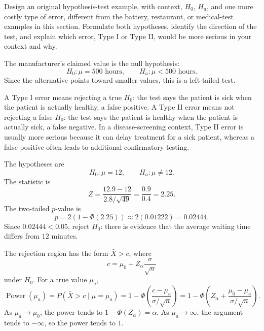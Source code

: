 \begin{problema}\label{prob:d04b6da}
Design an original hypothesis-test example, with context, $H_0$, $H_a$, and one more costly type of error, different from the battery, restaurant, or medical-test examples in this section. Formulate both hypotheses, identify the direction of the test, and explain which error, Type I or Type II, would be more serious in your context and why.
\end{problema}

\begin{solproblema}
The manufacturer's claimed value is the null hypothesis:
\[
	H_0:\mu=500\text{ hours},\qquad H_a:\mu<500\text{ hours}.
\]
Since the alternative points toward smaller values, this is a left-tailed test.
\end{solproblema}

\begin{solproblema}[prob:78013c6]
A Type I error means rejecting a true $H_0$: the test says the patient is sick when the patient is actually healthy, a false positive. A Type II error means not rejecting a false $H_0$: the test says the patient is healthy when the patient is actually sick, a false negative. In a disease-screening context, Type II error is usually more serious because it can delay treatment for a sick patient, whereas a false positive often leads to additional confirmatory testing.
\end{solproblema}

\begin{solproblema}[prob:74dc84f]
The hypotheses are
\[
	H_0:\mu=12,\qquad H_a:\mu\ne12.
\]
The statistic is
\[
	Z=\frac{12.9-12}{2.8/\sqrt{49}}=\frac{0.9}{0.4}=2.25.
\]
The two-tailed $p$-value is
\[
	p=2(1-\Phi(2.25))\approx2(0.01222)=0.02444.
\]
Since $0.02444<0.05$, reject $H_0$: there is evidence that the average waiting time differs from $12$ minutes.
\end{solproblema}

\begin{solproblema}
The rejection region has the form $\bar X>c$, where
\[
	c=\mu_0+Z_\alpha\frac{\sigma}{\sqrt n}
\]
under $H_0$. For a true value $\mu_a$,
\[
	\operatorname{Power}(\mu_a)
	=P(\bar X>c\mid\mu=\mu_a)
	=1-\Phi\left(\frac{c-\mu_a}{\sigma/\sqrt n}\right)
	=1-\Phi\left(Z_\alpha+\frac{\mu_0-\mu_a}{\sigma/\sqrt n}\right).
\]
As $\mu_a\to\mu_0$, the power tends to $1-\Phi(Z_\alpha)=\alpha$. As $\mu_a\to\infty$, the argument tends to $-\infty$, so the power tends to $1$.
\end{solproblema}

